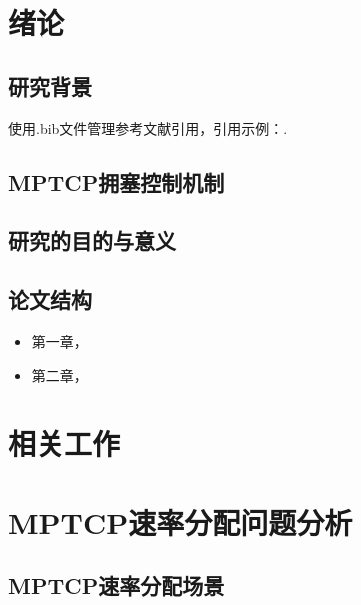 \documentclass[winfonts,bachelor,oneside,nobackinfo]{njuthesis}
\begin{document}
\mainmatter

\chapter{绪论}\label{chapter_introduction}
\section{研究背景}
使用.bib文件管理参考文献引用，引用示例：\cite{BHR12}.\par
\lipsum[1]

\section{MPTCP拥塞控制机制}\label{subsec:mptcp_conges}
\lipsum[1]

\section{研究的目的与意义}
\lipsum[1]




\section{论文结构}

\lipsum[1]
\begin{itemize}
\item 第一章，
\item 第二章，

\end{itemize}



\chapter{相关工作}

\lipsum[1]

\chapter{MPTCP速率分配问题分析}

\lipsum[1]

\section{MPTCP速率分配场景}\label{sec:rate}
\lipsum[1]
\end{document}
